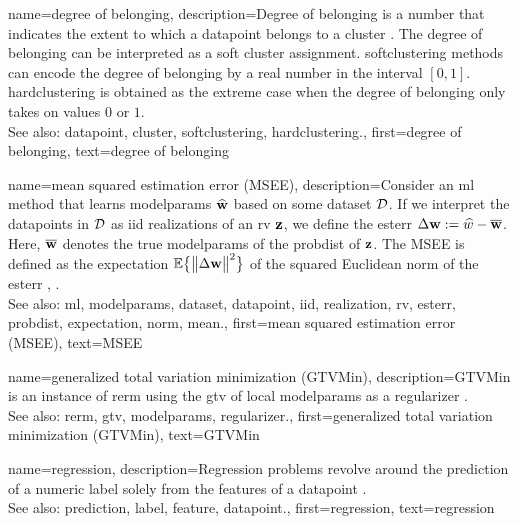 {name={degree of belonging},
	description={Degree of belonging is a number that indicates the extent to which a \gls{datapoint} 
		belongs to a \gls{cluster} \cite[Ch. 8]{MLBasics}. The degree of belonging can be 
		interpreted as a soft \gls{cluster} assignment. \Gls{softclustering} methods can 
		encode the degree of belonging by a real number in the interval $[0,1]$. 
		\Gls{hardclustering} is obtained as the extreme case when the degree of belonging 
		only takes on values $0$ or $1$.
					\\ 
		See also: \gls{datapoint}, \gls{cluster}, \gls{softclustering}, \gls{hardclustering}.}, 
	first={degree of belonging},
	text={degree of belonging} 
}

{name={mean squared estimation error (MSEE)},
	description={Consider an \gls{ml} method that 
		learns \gls{modelparams} $\widehat{{\bf w}}$ based on some \gls{dataset} $\mathcal{D}$. 
		If we interpret the \glspl{datapoint} in $\mathcal{D}$ as \gls{iid} \glspl{realization} of an \gls{rv} ${\bf z}$, 
		we define the \gls{esterr} $\Delta {\bf w} := \widehat{w} - \overline{{\bf w}}$. 
		Here, $\overline{{\bf w}}$ denotes the true \gls{modelparams} of the \gls{probdist} 
		of ${\bf z}$. The MSEE is 
		defined as the \gls{expectation} $\mathbb{E} \big\{ \big\| \Delta {\bf w} \big\|^{2} \big\}$ of the 
		squared Euclidean \gls{norm} of the \gls{esterr} \cite{LC}, \cite{kay}.
					\\ 
		See also: \gls{ml}, \gls{modelparams}, \gls{dataset}, \gls{datapoint}, \gls{iid}, \gls{realization}, \gls{rv}, \gls{esterr}, \gls{probdist}, \gls{expectation}, \gls{norm}, \gls{mean}.},
	first={mean squared estimation error (MSEE)},
	text={MSEE} 
}

{name={generalized total variation minimization (GTVMin)},
	description={GTVMin is an instance of \gls{rerm} 
		using the \gls{gtv} of local \gls{modelparams} as a \gls{regularizer} \cite{ClusteredFLTVMinTSP}.
					\\ 
		See also: \gls{rerm}, \gls{gtv}, \gls{modelparams}, \gls{regularizer}.},
	first={generalized total variation minimization (GTVMin)},
	text={GTVMin} 
}

{name={regression},
	description={Regression problems revolve around the 
		\gls{prediction} of a numeric \gls{label} solely from the \glspl{feature} of a \gls{datapoint} \cite[Ch. 2]{MLBasics}.
					\\ 
		See also: \gls{prediction}, \gls{label}, \gls{feature}, \gls{datapoint}.},
	first={regression},
	text={regression} 
}


